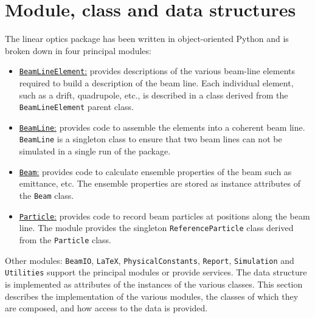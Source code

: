 \graphicspath{ {06-MCD/Figures/} }

\section{Module, class and data structures}


The linear optics package has been written in object-oriented Python
and is broken down in four principal modules:
\begin{itemize}
  \item \underline{\texttt{BeamLineElement}:} provides descriptions
    of the various beam-line elements required to build a description
    of the beam line.
    Each individual element, such as a drift, quadrupole, etc., is
    described in a class derived from the \texttt{BeamLineElement}
    parent class.
  \item \underline{\texttt{BeamLine}:} provides code to assemble the
    elements into a coherent beam line.
    \texttt{BeamLine} is a singleton class to ensure that two beam
    lines can not be simulated in a single run of the package.
  \item \underline{\texttt{Beam}:} provides code to calculate
    ensemble properties of the beam such as emittance, etc.
    The ensemble properties are stored as instance attributes of
    the \texttt{Beam} class.
  \item \underline{\texttt{Particle}:} provides code to record beam
    particles at positions along the beam line.
    The module provides the singleton \texttt{ReferenceParticle}
    class derived from the \texttt{Particle} class.
\end{itemize}
Other modules: \texttt{BeamIO}, \texttt{LaTeX},
\texttt{PhysicalConstants}, \texttt{Report}, \texttt{Simulation}
and \texttt{Utilities} support the principal modules or provide
services.
The data structure is implemented as attributes of the instances of the 
various classes.
This section describes the implementation of the various modules, the
classes of which they are composed, and how access to the data is
provided.

